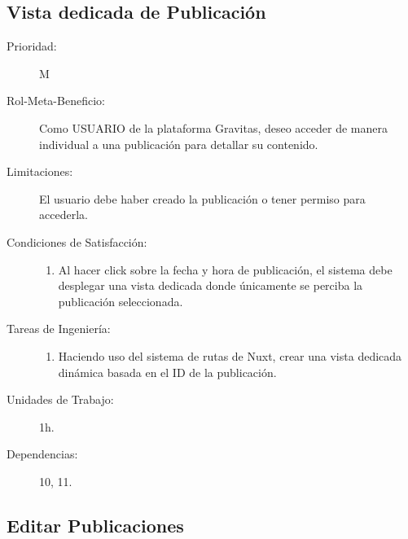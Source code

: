 \subsection{Vista dedicada de Publicación}

\begin{description}
    \item[Prioridad:] M
    \item[Rol-Meta-Beneficio:]  Como USUARIO de la plataforma Gravitas, deseo  acceder de manera individual a una publicación para detallar su contenido.
    \item[Limitaciones:] El usuario debe haber creado la publicación o tener permiso para accederla.
    \item[Condiciones de Satisfacción:]  \hfill
        \begin{enumerate}
            \item Al hacer click sobre la fecha y hora de publicación, el sistema debe desplegar una vista dedicada donde únicamente se perciba la publicación seleccionada.
        \end{enumerate}
    \item[Tareas de Ingeniería:]  \hfill
        \begin{enumerate}
            \item Haciendo uso del sistema de rutas de Nuxt, crear una vista dedicada dinámica basada en el ID de la publicación.
        \end{enumerate}
    \item[Unidades de Trabajo:] 1h.
    \item[Dependencias:] 10, 11.
\end{description}

\newpage

\subsection{Editar Publicaciones}

